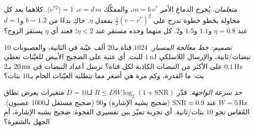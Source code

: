 \begin{exercise}[\lvlB]
\label{ex:17:5}
\emph{متعلمان.} يُخرج الدماغ الأمر $m=b\,v^*$، والمفكِّك $v=d\,m$، $\langle v^{*2}\rangle=1$. كلاهما بعد كل محاولة يخطو خطوة تدرج على $\tfrac12(v-v^*)^2$ بمعدل $\eta$. حاكِ بدءًا من $b=1.2$ و$d=1$ عند $\eta=0.8$ و$1.1$ و$1.5$ و$2$. كل منهما وحده مستقر عند $\eta<2$؛ فعند أي $\eta$ يستقر الزوج؟
\end{exercise}

\begin{exercise}[\lvlB]
\label{ex:17:6}
\emph{تصميم: خط معالجة المسبار.} $1024$ قناة بـ$20$ ألف عيّنة في الثانية، والعصبونات $10$ نبضات/ثانية، والإرسال اللاسلكي $1\,\text{nJ}$ للبت. أي عتبة على الضجيج الأبيض للعيّنات تعطي $0.1\,\text{Hz}$ على الأكثر من النبضات الكاذبة لكل قناة؟ نرسل أعداد النبضات في $20\,\text{ms}$ بـ$2$ بت: ما القدرة، وكم مرة هي أصغر مما تتطلبه العيّنات الخام بـ$10$ بتات؟
\end{exercise}

\begin{exercise}[\lvlC]
\label{ex:17:7}
\emph{حد سرعة الواجهة.} قدّر $R\le DW\log_2(1+\text{SNR})$ لـ$D=10$ متغيرات بعرض نطاق $W=5\,\text{Hz}$ عند $\text{SNR}\approx0.9$ (ضجيج يشبه الإشارة) و$90$ (ضجيج مستقل لـ$1000$ عصبون). المُقاس نحو $10$ بتات/ثانية. أي تجربة تميّز بين تفسيري الفجوة: ضجيج يشبه الإشارة، أم الجهل بالشفرة؟
\end{exercise}
